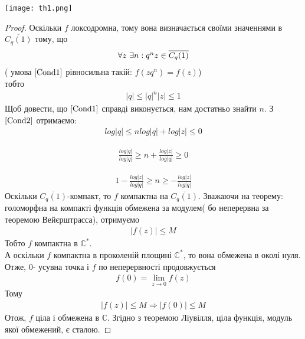 \documentclass[12pt,a4paper]{article}
\begin{document}
\texttt{[image: th1.png]}
\begin{proof}
Оскільки $f$ локсодромна, тому вона визначається своїми значеннями в $\overline{C_{q}(1)}$ тому, що 
\begin{equation}\label{Cond1}
\begin{array}{l}
 \forall z $ $\exists n: q^{n}z \in \overline{C_{q}(1)} 
\end{array}
\end{equation} 
( умова $\eqref{Cond1}$ рівносильна такій: $f(zq^{n})=f(z)$)\\
тобто
\begin{equation}\label{Cond2}
\begin{array}{l}
\vert q \vert \leq \vert q\vert ^{n} \vert z\vert \leq 1                       
\end{array}
\end{equation}
Щоб довести, що $\eqref{Cond1}$ справді виконується, нам достатньо знайти $n$. З $\eqref{Cond2}$ отримаємо:
\[\begin{array}{l}
log\vert q \vert \leq n log\vert q\vert +log \vert z\vert \leq 0                       
\end{array}\]

\[\begin{array}{l}
\frac {log\vert q \vert }{log\vert q\vert} \geq n  + \frac{ log \vert z\vert}{log\vert q\vert} \geq 0                       
\end{array}\]

\[\begin{array}{l}
1- \frac{ log \vert z\vert}{log\vert q\vert} \geq n  \geq -\frac{ log \vert z\vert}{log\vert q\vert} 
\end{array}\]
Оскільки $\overline{C_{q}(1)}$-компакт, то $f$ компактна на $\overline{C_{q}(1)}$. Зважаючи на теорему: голоморфна на компакті функція обмежена за модулем( бо неперервна за теоремою Вейєрштрасса), отримуємо
\[\begin{array}{l}
  \vert f(z) \vert\leq M
\end{array}\]
Тобто $f$ компактна в $\mathbb{C}^{*}$. \\
А оскільки $f$ компактна в проколеній площині $\mathbb{C}^{*}$, то вона обмежена в околі нуля. Отже, $0$- усувна точка і $f$ по неперервності продовжується
\[\begin{array}{l}
  f(0)=\lim_{z\rightarrow 0} f(z)
\end{array}\]
Тому 
\[\begin{array}{l}
  \vert f(z) \vert\leq M \Longrightarrow \vert f(0) \vert\leq M
\end{array}\]
Отож, $f$ ціла і обмежена в $\mathbb{C}$. Згідно з теоремою Ліувілля, ціла функція, модуль якої обмежений, є сталою.
\end{proof}
\[\begin{array}{l}
\end{array} \]
\end{document}
